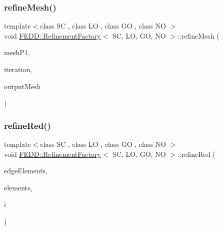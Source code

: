 \subsubsection{\texorpdfstring{refine\+Mesh()}{refineMesh()}}
{\footnotesize\ttfamily template$<$class SC , class LO , class GO , class NO $>$ \\
void \hyperlink{classFEDD_1_1RefinementFactory}{F\+E\+D\+D\+::\+Refinement\+Factory}$<$ SC, LO, GO, NO $>$\+::refine\+Mesh (\begin{DoxyParamCaption}\item[{\hyperlink{classFEDD_1_1RefinementFactory_a1a278d01c278972af01f2996247af8ac}{Mesh\+Unstr\+Ptr\+\_\+\+Type}}]{mesh\+P1,  }\item[{int}]{iteration,  }\item[{\hyperlink{classFEDD_1_1RefinementFactory_a1a278d01c278972af01f2996247af8ac}{Mesh\+Unstr\+Ptr\+\_\+\+Type}}]{output\+Mesh }\end{DoxyParamCaption})}

\mbox{\label{classFEDD_1_1RefinementFactory_ad8bc07f5d6bfe7f7180bd32d7cc4ea0c}} 
\subsubsection{\texorpdfstring{refine\+Red()}{refineRed()}}
{\footnotesize\ttfamily template$<$class SC , class LO , class GO , class NO $>$ \\
void \hyperlink{classFEDD_1_1RefinementFactory}{F\+E\+D\+D\+::\+Refinement\+Factory}$<$ SC, LO, GO, NO $>$\+::refine\+Red (\begin{DoxyParamCaption}\item[{\hyperlink{classFEDD_1_1RefinementFactory_ae5285e990ec4632d6188a1280627ad13}{Edge\+Elements\+Ptr\+\_\+\+Type}}]{edge\+Elements,  }\item[{\hyperlink{classFEDD_1_1RefinementFactory_a0994b5b7b6d080048673941251999f2e}{Elements\+Ptr\+\_\+\+Type}}]{elements,  }\item[{int}]{i }\end{DoxyParamCaption})}

\mbox{\label{classFEDD_1_1RefinementFactory_a530ccd6a31c259515ab1900d544eb813}} 
